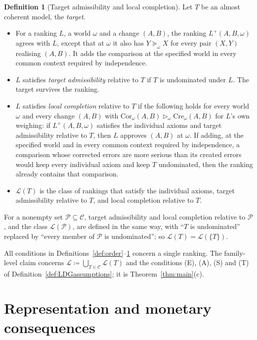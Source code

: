 \documentclass[11pt]{article}
\theoremstyle{definition}
\newtheorem{definition}[theorem]{Definition}
\newcommand{\C}{\mathcal C}
\newcommand{\Lc}{\mathcal L}
\newcommand{\Pc}{\mathcal P}
\newcommand{\Cor}{\mathrm{Cor}}
\newcommand{\Cre}{\mathrm{Cre}}
\newcommand{\sgt}{\triangleright}
\begin{document}
\begin{definition}[Target admissibility and local completion]\label{def:local}
Let $T$ be an almost coherent model, the \emph{target}.
\begin{itemize}[leftmargin=*]
\item For a ranking $L$, a world $\omega$ and a change $(A,B)$, the ranking $L^+(A,B,\omega)$ agrees with $L$, except that at $\omega$ it also has $Y\succeq_\omega X$ for every pair $(X,Y)$ realising $(A,B)$. It adds the comparison at the specified world in every common context required by independence.
\item $L$ satisfies \emph{target admissibility} relative to $T$ if $T$ is undominated under $L$. The target survives the ranking.
\item $L$ satisfies \emph{local completion} relative to $T$ if the following holds for every world $\omega$ and every change $(A,B)$ with $\Cor_\omega(A,B)\sgt_\omega\Cre_\omega(A,B)$ for $L$'s own weighing: if $L^+(A,B,\omega)$ satisfies the individual axioms and target admissibility relative to $T$, then $L$ approves $(A,B)$ at $\omega$. If adding, at the specified world and in every common context required by independence, a comparison whose corrected errors are more serious than its created errors would keep every individual axiom and keep $T$ undominated, then the ranking already contains that comparison.
\item $\Lc(T)$ is the class of rankings that satisfy the individual axioms, target admissibility relative to $T$, and local completion relative to $T$.
\end{itemize}
For a nonempty set $\Pc\subseteq\C$, target admissibility and local completion relative to $\Pc$, and the class $\Lc(\Pc)$, are defined in the same way, with ``$T$ is undominated'' replaced by ``every member of $\Pc$ is undominated''; so $\Lc(T)=\Lc(\{T\})$.
\end{definition}

All conditions in Definitions~\ref{def:order}--\ref{def:local} concern a single ranking. The family-level claim concerns $\Lc\coloneqq\bigcup_{T\in\C}\Lc(T)$ and the conditions (E), (A), (S) and (T) of Definition~\ref{def:LDGassumptions}; it is Theorem~\ref{thm:main}(c).
\endgroup

\begingroup\color{red}
\section{Representation and monetary consequences}\label{sec:representation}
\end{document}
